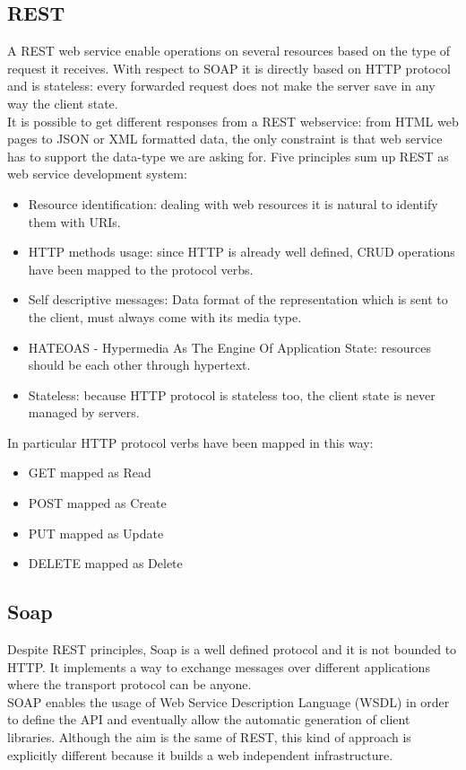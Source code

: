 \subsection{REST}
\label{subsection:REST}
A REST web service enable operations on several resources based on the type of request it receives.
With respect to SOAP it is directly based on HTTP protocol and is stateless: every forwarded request does not make the server save in any way the client state.\\
It is possible to get different responses from a REST webservice: from HTML web pages to JSON or XML formatted data, the only constraint is that web service has to support the data-type we are asking for.
Five principles sum up REST as web service development system:
\begin{itemize}
    \item Resource identification: dealing with web resources it is natural to identify them with URIs.
    \item HTTP methods usage: since HTTP is already well defined, CRUD operations have been mapped to the protocol verbs.
    \item Self descriptive messages: Data format of the representation which is sent to the client, must always come with its media type.
    \item HATEOAS - Hypermedia As The Engine Of Application State: resources should be  each other through hypertext.
    \item Stateless: because HTTP protocol is stateless too, the client state is never managed by servers.
\end{itemize}
In particular HTTP protocol verbs have been mapped in this way:
\begin{itemize}
    \item GET mapped as Read
    \item POST mapped as Create
    \item PUT mapped as Update
    \item DELETE mapped as Delete
\end{itemize}
\subsection{Soap}
\label{subsection:Soap}
Despite REST principles, Soap is a well defined protocol and it is not bounded to HTTP. It implements a way to exchange messages over different applications where the transport protocol can be anyone.\\
SOAP enables the usage of Web Service Description Language (WSDL) in order to define the API and eventually allow the automatic generation of client libraries.
Although the aim is the same of REST, this kind of approach is explicitly different because it builds a web independent infrastructure. \cite{soap_vs_rest} 

